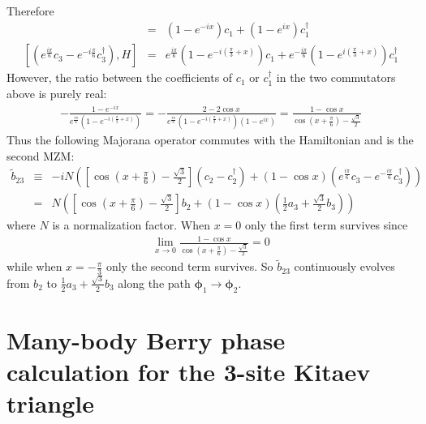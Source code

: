 \documentclass[aps,prb,showpacs,amsmath,amssymb,superscriptaddress]{revtex4-2}
\begin{document}
Therefore
\begin{eqnarray}
	[c_2 - c_2^\dag, H] &=& (1-e^{-ix})c_1 + (1-e^{ix})c_1^\dag\\\nonumber
	[\left( e^{\frac{i\pi}{6}} c_3 - e^{-i\frac{\pi}{6}} c_3^\dag \right), H] & = &  e^{\frac{i\pi}{6}} (1-e^{-i\left(\frac{\pi}{3} + x\right)})c_1 + e^{-\frac{i\pi}{6}}( 1- e^{i\left(\frac{\pi}{3} + x\right)})c_1^\dag
\end{eqnarray}
However, the ratio between the coefficients of $c_1$ or $c_1^\dag$ in the two commutators above is purely real:
\begin{eqnarray}
-\frac{1-e^{-ix}}{e^{\frac{i\pi}{6}} (1-e^{-i\left(\frac{\pi}{3} + x\right)})} = - \frac{2-2\cos x}{e^{\frac{i\pi}{6}} (1-e^{-i\left(\frac{\pi}{3} + x\right)})(1-e^{ix})} = \frac{1-\cos x}{\cos\left( x+ \frac{\pi}{6}\right)-\frac{\sqrt{3}}{2}}
\end{eqnarray}
Thus the following Majorana operator commutes with the Hamiltonian and is the second MZM:
\begin{eqnarray}
	\tilde{b}_{23} &\equiv& -iN\left(\left[\cos\left( x+ \frac{\pi}{6}\right)-\frac{\sqrt{3}}{2}\right](c_2 - c_2^\dag) + (1-\cos x) \left( e^{\frac{i\pi}{6}} c_3 -e^{-\frac{i\pi}{6}} c_3^\dag\right)\right)\\\nonumber
	&=& N\left(\left[\cos\left( x+ \frac{\pi}{6}\right)-\frac{\sqrt{3}}{2}\right]b_2 + (1-\cos x)\left( \frac{1}{2} a_3 + \frac{\sqrt{3}}{2} b_3\right)\right)
\end{eqnarray}
where $N$ is a normalization factor. When $x=0$ only the first term survives since
\begin{eqnarray}
\lim_{x\rightarrow 0} \frac{1-\cos x}{\cos\left( x+ \frac{\pi}{6}\right)-\frac{\sqrt{3}}{2}} = 0 
\end{eqnarray}
while when $x = -\frac{\pi}{3}$ only the second term survives. So $\tilde{b}_{23}$ continuously evolves from $b_2$ to $\frac{1}{2} a_3 + \frac{\sqrt{3}}{2} b_3$ along the path $\boldsymbol{\phi}_1\rightarrow \boldsymbol{\phi}_2$. 

\section{Many-body Berry phase calculation for the 3-site Kitaev triangle}
\end{document}
